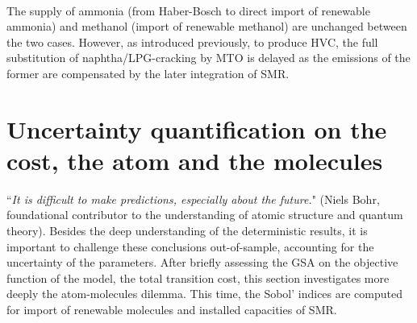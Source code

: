 \\

The supply of ammonia (\ie from Haber-Bosch to direct import of renewable ammonia) and methanol (\ie import of renewable methanol) are unchanged between the two cases. However, as introduced previously, to produce \gls{HVC}, the full substitution of naphtha/LPG-cracking by \gls{MTO} is delayed as the emissions of the former are compensated by the later integration of \gls{SMR}.

\section{Uncertainty quantification on the cost, the atom and the molecules}
\label{sec:atom_mol:results_uq}
``\textit{It is difficult to make predictions, especially about the future.}" (Niels Bohr, foundational contributor to the understanding of atomic structure and quantum theory). Besides the deep understanding of the deterministic results, it is important to challenge these conclusions out-of-sample, accounting for the uncertainty of the parameters. After briefly assessing the \gls{GSA} on the objective function of the model, the total transition cost, this section investigates more deeply the atom-molecules dilemma. This time, the Sobol' indices are computed for import of renewable molecules and installed capacities of \gls{SMR}.


